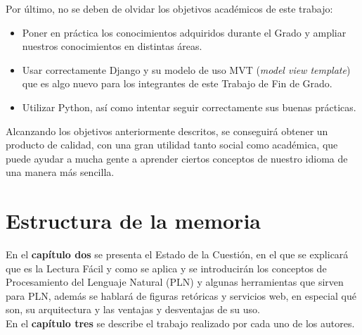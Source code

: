 Por último, no se deben de olvidar los objetivos académicos de este trabajo:
\begin{itemize}
	\item Poner en práctica los conocimientos adquiridos durante el Grado y ampliar nuestros conocimientos en distintas áreas.
	\item Usar correctamente Django y su modelo de uso MVT (\textit{model view template}) que es algo nuevo para los integrantes de este Trabajo de Fin de Grado.
	\item Utilizar Python, así como intentar seguir correctamente sus buenas prácticas.
	
\end{itemize}

Alcanzando los objetivos anteriormente descritos, se conseguirá obtener un producto de calidad, con una gran utilidad tanto social como académica, que puede ayudar a mucha gente a aprender ciertos conceptos de nuestro idioma de una manera más sencilla.
	
	
\section{Estructura de la memoria}
\label{cap:sec:estructuramemoria}


En el \textbf{capítulo dos} se presenta el Estado de la Cuestión, en el que se explicará que es la Lectura Fácil y como se aplica y se introducirán los conceptos de Procesamiento del Lenguaje Natural (PLN) y algunas herramientas que sirven para PLN, además se hablará de figuras retóricas y servicios web, en especial qué son, su arquitectura y las ventajas y desventajas de su uso.\\


En el \textbf{capítulo tres} se describe el trabajo realizado por cada uno de los autores.
